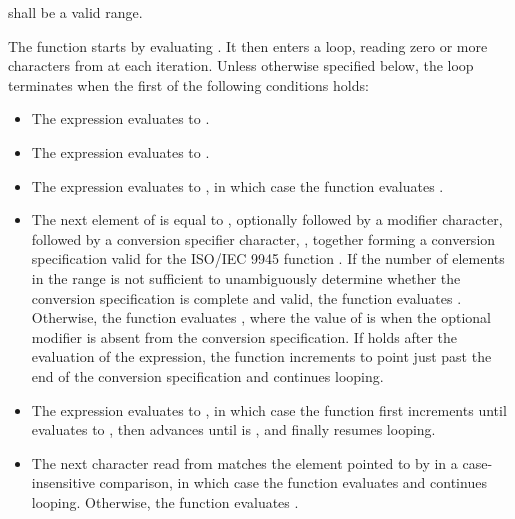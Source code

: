 \begin{itemdescr}
\pnum
\requires {} shall be a valid range.

\pnum
\effects The function starts by evaluating
. It then enters a loop, reading zero or more
characters from  at each iteration. Unless otherwise specified below,
the loop terminates when the first of the following conditions holds:

\begin{itemize}
\item The expression  evaluates to .

\item The expression  evaluates to .

\item The expression  evaluates to ,
in which case the function
evaluates .

\item The next element of  is equal to
, optionally followed by a
modifier character, followed by a conversion specifier character,
, together forming a conversion specification valid for the
ISO/IEC 9945 function . If the number of elements in the range
 is not sufficient to unambiguously determine whether the
conversion specification is complete and valid, the function evaluates
. Otherwise, the function evaluates
, where the value
of  is 
when the optional modifier is absent from the conversion specification.
If  holds after the evaluation of the
expression, the function increments  to point just past the end of
the conversion specification and continues looping.

\item The expression  evaluates to ,
in which case
the function first increments  until
 evaluates to ,
then advances  until
 is , and finally resumes looping.

\item The next character read from  matches the element
pointed to by  in
a case-insensitive comparison, in which case the function evaluates
 and continues looping. Otherwise, the function evaluates
.
\end{itemize}


\end{itemdescr}
